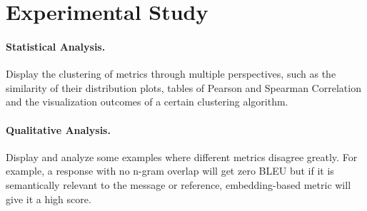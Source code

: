 \section{Experimental Study}
\paragraph{Statistical Analysis.}
Display the clustering of metrics through multiple perspectives,
such as the similarity of their distribution plots, tables of Pearson and Spearman Correlation
and the visualization outcomes of a certain clustering algorithm.

\paragraph{Qualitative Analysis.}
Display and analyze some examples where different metrics disagree greatly.
For example, a response with no n-gram overlap will get zero BLEU but if it is semantically
relevant to the message or reference, embedding-based metric will give it a high score.
